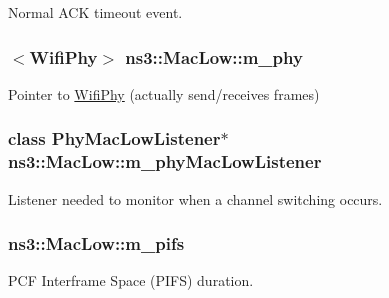 Normal A\+CK timeout event. 

\subsubsection[{\texorpdfstring{m\+\_\+phy}{m_phy}}]{$<${\bf Wifi\+Phy}$>$ ns3\+::\+Mac\+Low\+::m\+\_\+phy\hspace{0.3cm}{\ttfamily [private]}}\hypertarget{classns3_1_1MacLow_aec8aefec9501f9d7c06b6cd0ee1353ee}{}\label{classns3_1_1MacLow_aec8aefec9501f9d7c06b6cd0ee1353ee}


Pointer to \hyperlink{classns3_1_1WifiPhy}{Wifi\+Phy} (actually send/receives frames) 

\subsubsection[{\texorpdfstring{m\+\_\+phy\+Mac\+Low\+Listener}{m_phyMacLowListener}}]{\setlength{\rightskip}{0pt plus 5cm}class {\bf Phy\+Mac\+Low\+Listener}$\ast$ ns3\+::\+Mac\+Low\+::m\+\_\+phy\+Mac\+Low\+Listener\hspace{0.3cm}{\ttfamily [private]}}\hypertarget{classns3_1_1MacLow_a1c49aaf243c751beb27655a0c5e72b86}{}\label{classns3_1_1MacLow_a1c49aaf243c751beb27655a0c5e72b86}


Listener needed to monitor when a channel switching occurs. 

\subsubsection[{\texorpdfstring{m\+\_\+pifs}{m_pifs}}]{ ns3\+::\+Mac\+Low\+::m\+\_\+pifs\hspace{0.3cm}{\ttfamily [private]}}\hypertarget{classns3_1_1MacLow_a115cd42f0f4a32f94c7cf80f3ad8efe9}{}\label{classns3_1_1MacLow_a115cd42f0f4a32f94c7cf80f3ad8efe9}


P\+CF Interframe Space (P\+I\+FS) duration. 

